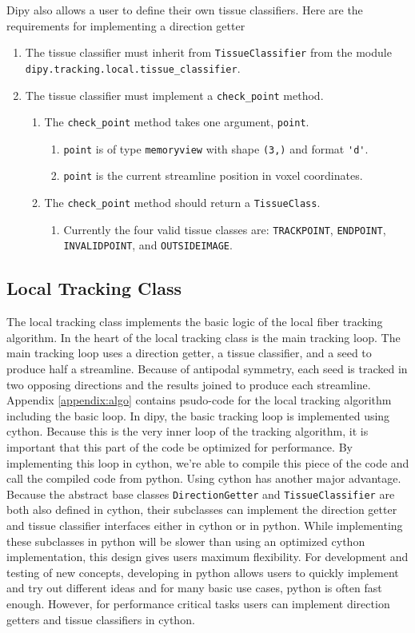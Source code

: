     Dipy also allows a user to define their own tissue classifiers. Here are the requirements for implementing a direction getter
\begin{enumerate}
\item The tissue classifier must inherit from \verb|TissueClassifier| from the module \verb|dipy.tracking.local.tissue_classifier|.
\item The tissue classifier must implement a \verb|check_point| method.
\begin{enumerate}
\item The \verb|check_point| method takes one argument, \verb|point|.
\begin{enumerate}
\item \verb|point| is of type \verb|memoryview| with shape \verb|(3,)| and format \verb|'d'|.
\item \verb|point| is the current streamline position in voxel coordinates.
\end{enumerate}
\item The \verb|check_point| method should return a \verb|TissueClass|.
\begin{enumerate}
\item Currently the four valid tissue classes are:  \verb|TRACKPOINT|, \verb|ENDPOINT|, \verb|INVALIDPOINT|, and \verb|OUTSIDEIMAGE|.
\end{enumerate}
\end{enumerate}
\end{enumerate}

\subsection{Local Tracking Class}
    The local tracking class implements the basic logic of the local fiber tracking algorithm. In the heart of the local tracking class is the main tracking loop. The main tracking loop uses a direction getter, a tissue classifier, and a seed to produce half a streamline. Because of antipodal symmetry, each seed is tracked in two opposing directions and the results joined to produce each streamline. Appendix \ref{appendix:algo} contains psudo-code for the local tracking algorithm including the basic loop. In dipy, the basic tracking loop is implemented using cython. Because this is the very inner loop of the tracking algorithm, it is important that this part of the code be optimized for performance. By implementing this loop in cython, we're able to compile this piece of the code and call the compiled code from python. Using cython has another major advantage. Because the abstract base classes \verb|DirectionGetter| and \verb|TissueClassifier| are both also defined in cython, their subclasses can implement the direction getter and tissue classifier interfaces either in cython or in python. While implementing these subclasses in python will be slower than using an optimized cython implementation, this design gives users maximum flexibility. For development and testing of new concepts, developing in python allows users to quickly implement and try out different ideas and for many basic use cases, python is often fast enough. However, for performance critical tasks users can implement direction getters and tissue classifiers in cython.